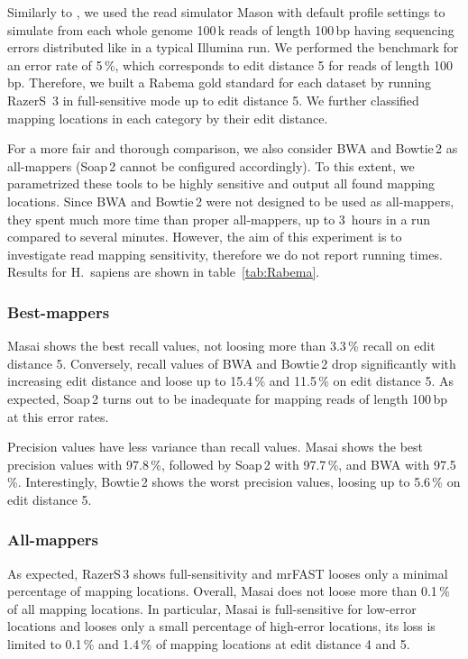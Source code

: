 Similarly to \citep{Bowtie2}, we used the read simulator Mason \citep{SeqAnReadSimulator} with default profile settings to simulate from each whole genome 100\,k reads of length 100\,bp having sequencing errors distributed like in a typical Illumina run.
We performed the benchmark for an error rate of 5\,\%, which corresponds to edit distance 5 for reads of length 100\,bp. Therefore, we built a Rabema gold standard for each dataset by running RazerS~3 in full-sensitive mode up to edit distance 5. We further classified mapping locations in each category by their edit distance.

For a more fair and thorough comparison, we also consider BWA and Bowtie\,2 as all-mappers (Soap\,2 cannot be configured accordingly).
To this extent, we parametrized these tools to be highly sensitive and output all found mapping locations.
Since BWA and Bowtie\,2 were not designed to be used as all-mappers, they spent much more time than proper all-mappers, \ie up to 3~hours in a run compared to several minutes.
However, the aim of this experiment is to investigate read mapping sensitivity, therefore we do not report running times.
Results for H.~sapiens are shown in table~\ref{tab:Rabema}.

\subsubsection{Best-mappers}
Masai shows the best recall values, not loosing more than 3.3\,\% recall on edit distance 5.
Conversely, recall values of BWA and Bowtie\,2 drop significantly with increasing edit distance and loose up to 15.4\,\% and 11.5\,\% on edit distance 5.
As expected, Soap\,2 turns out to be inadequate for mapping reads of length 100\,bp at this error rates.

Precision values have less variance than recall values. Masai shows the best precision values with 97.8\,\%, followed by Soap\,2 with 97.7\,\%, and BWA with 97.5\,\%. Interestingly, Bowtie\,2 shows the worst precision values, loosing up to 5.6\,\% on edit distance 5.

\subsubsection{All-mappers}
As expected, RazerS\,3 shows full-sensitivity and mrFAST looses only a minimal percentage of mapping locations.
Overall, Masai does not loose more than 0.1\,\% of all mapping locations.
In particular, Masai is full-sensitive for low-error locations and looses only a small percentage of high-error locations, \ie its loss is limited to 0.1\,\% and 1.4\,\% of mapping locations at edit distance 4 and 5.

